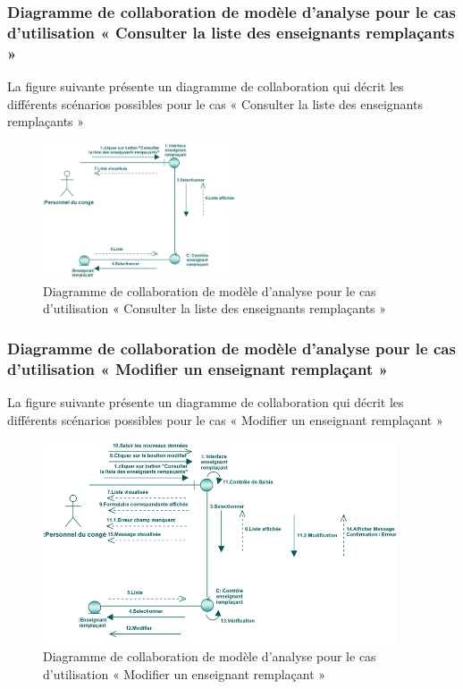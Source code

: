 \documentclass[12 pt ]{report}
\begin{document}
\subsubsection{Diagramme  de  collaboration  de  modèle  d'analyse  pour  le  cas  d'utilisation « Consulter la liste des enseignants remplaçants »   }
La figure suivante présente un diagramme de collaboration qui décrit les différents
scénarios possibles pour le cas « Consulter la liste des enseignants remplaçants  »  
\begin{figure}[h]
\begin{center}
\includegraphics[width= 12 cm , height =4cm]{colla_con_rem.PNG}
 \caption{Diagramme  de  collaboration  de  modèle  d'analyse  pour  le  cas  d'utilisation « Consulter la liste des enseignants remplaçants  »  }
\end{center}
\end{figure}
\subsubsection{Diagramme  de  collaboration  de  modèle  d'analyse  pour  le  cas  d'utilisation « Modifier un enseignant remplaçant »   }
La figure suivante présente un diagramme de collaboration qui décrit les différents
scénarios possibles pour le cas « Modifier un enseignant remplaçant »  
\begin{figure}[h]
\begin{center}
\includegraphics[width= 12 cm , height =6cm]{colla_mod_rem.PNG}
 \caption{Diagramme  de  collaboration  de  modèle  d'analyse  pour  le  cas  d'utilisation « Modifier un enseignant remplaçant »  }
\end{center}
\end{figure}
\end{document}
